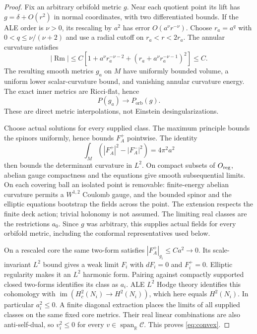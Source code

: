 \documentclass[11pt]{article}
\newcommand{\Rm}{\operatorname{Rm}}
\newcommand{\R}{\mathbb R}
\newcommand{\orb}{\mathrm{orb}}
\begin{document}
\begin{proof}
Fix an arbitrary orbifold metric $g$. Near each quotient point its lift has
$g=\delta+O(r^2)$ in normal coordinates, with two differentiated bounds.
If the ALE order is $\nu>0$, its rescaling by $a^2$ has error
$O(a^\nu r^{-\nu})$. Choose $r_a=a^q$ with
$0<q\le\nu/(\nu+2)$ and use a radial cutoff on
$r_a<r<2r_a$. The annular curvature satisfies
\[
 |\Rm|\le C\left[1+a^\nu r_a^{-\nu-2}
                 +(r_a+a^\nu r_a^{-\nu-1})^2\right]\le C.
\]
The resulting smooth metrics $g_a$ on $M$ have uniformly bounded volume,
a uniform lower scalar-curvature bound, and vanishing annular curvature
energy. The exact inner metrics are Ricci-flat, hence
\begin{equation}
 P(g_a)\longrightarrow P_{\orb}(g).
 \label{eq:smoothing}
\end{equation}
These are direct metric interpolations, not Einstein desingularizations.

Choose actual solutions for every supplied class. The maximum principle
bounds the spinors uniformly, hence bounds $F_A^+$ pointwise. The identity
\[
 \int_M(|F_A^+|^2-|F_A^-|^2)=4\pi^2a^2
\]
then bounds the determinant curvature in $L^2$. On compact subsets of
$O_{\rm reg}$, abelian gauge compactness and the equations give smooth
subsequential limits. On each covering ball an isolated point is removable:
finite-energy abelian curvature permits a $W^{1,2}$ Coulomb gauge, and the
bounded spinor and the elliptic equations bootstrap the fields across the
point. The extension respects the finite deck action; trivial holonomy is
not assumed. The limiting real classes are the restrictions $a_0$.
Since $g$ was arbitrary, this supplies actual fields for every orbifold
metric, including the conformal representatives used below.

On a rescaled core the same two-form satisfies
$|F_A^+|_{g_i}\le Ca^2\to0$. Its scale-invariant $L^2$ bound gives a
weak limit $F_i$ with $dF_i=0$ and $F_i^+=0$.
Elliptic regularity makes it an $L^2$ harmonic form.
Pairing against compactly supported closed two-forms identifies its class
as $a_i$. ALE $L^2$ Hodge theory identifies this cohomology with
$\operatorname{im}(H_c^2(N_i)\to H^2(N_i))$, which here equals $H^2(N_i)$.
In particular $a_i^2\le0$. A finite diagonal extraction places the limits
of all supplied classes on the same fixed core metrics. Their real linear
combinations are also anti-self-dual, so $v_i^2\le0$ for every
$v\in\operatorname{span}_{\R}\mathcal C$. This proves \eqref{eq:convex}.


\end{proof}
\end{document}
